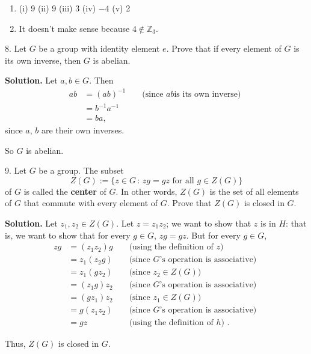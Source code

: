 \documentclass[10pt,]{book}
\newcommand{\terminology}[1]{\textbf{#1}}
\theoremstyle{plain}
\theoremstyle{definition}
\theoremstyle{definition}
\theoremstyle{definition}
\theoremstyle{definition}
\numberwithin{equation}{section}
\def\Z{\mathbb{Z}}
\newcommand{\amp}{&}
\begin{document}
\begin{exerciselist}
\begin{enumerate}[label=(\alph*)]
\item\hypertarget{li-133}{}(i) 9   (ii) 9   (iii) 3   (iv) \(-4\)   (v) 2%
\item\hypertarget{li-134}{}It doesn't make sense because \(4\not\in \Z_3\).%
\end{enumerate}
\item[8.]\hypertarget{exercise-19}{}Let \(G\) be a group with identity element \(e\). Prove that if every element of \(G\) is its own inverse, then \(G\) is abelian.%
\par\smallskip
\par\smallskip
\noindent\textbf{Solution.}\hypertarget{solution-19}{}\quad
Let \(a,b\in G\). Then%
%
\begin{align*}
ab\amp =(ab)^{-1}\amp \amp \text{ (since \(ab\)
is its own inverse) }\\
\amp =b^{-1}a^{-1}\amp \amp\\
\amp =ba, \amp
\end{align*}
since \(a\), \(b\) are their own inverses.%
\par
So \(G\) is abelian.%
\item[9.]\hypertarget{zgdef}{}Let \(G\) be a group. The subset%
\begin{equation*}
Z(G):=\{z \in G\,:\, zg=gz \mbox{ for all } g\in Z(G)\}
\end{equation*}
of \(G\) is called the \terminology{center} of \(G\). In other words, \(Z(G)\) is the set of all elements of \(G\) that commute with every element of \(G\). Prove that \(Z(G)\) is closed in \(G\).%
\par\smallskip
\par\smallskip
\noindent\textbf{Solution.}\hypertarget{solution-20}{}\quad
Let \(z_1, z_2\in Z(G)\). Let \(z=z_1z_2\); we want to show that \(z\) is in \(H\): that is, we want to show that for every \(g\in G\), \(zg=gz\). But for every \(g\in G\),%
\begin{align*}
zg\amp =(z_1z_2)g\amp \amp  \text{ (using the definition of \(z\)) }\\
\amp =z_1(z_2g)\amp \amp  \text{ (since \(G\)'s operation is associative) }\\
\amp =z_1(gz_2)\amp \amp  \text{ (since \(z_2\in Z(G)\)) }\\
\amp =(z_1g)z_2 \amp \amp  \text{ (since \(G\)'s operation is associative) }\\
\amp =(gz_1)z_2 \amp \amp  \text{ (since \(z_1\in Z(G)\)) }\\
\amp =g(z_1z_2)\amp \amp   \text{ (since \(G\)'s operation is associative) }\\
\amp =gz \amp \amp  \text{ (using the definition of \(h\)) } .
\end{align*}
%
\par
Thus, \(Z(G)\) is closed in \(G\).%
\end{exerciselist}
\typeout{************************************************}
\typeout{************************************************}
\end{document}
